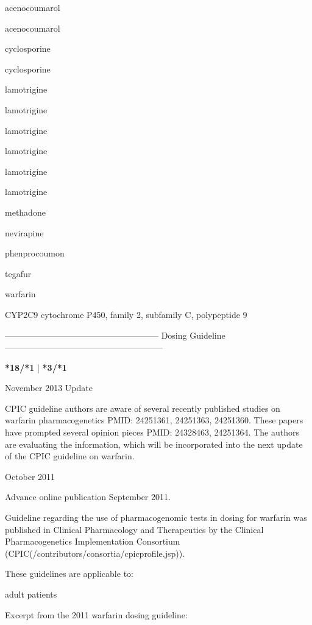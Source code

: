\documentclass{resume} %
\begin{document}
\begin{rSection}{ acenocoumarol }
\begin{rSection}{ acenocoumarol }
\begin{rSection}{ cyclosporine }
\begin{rSection}{ cyclosporine }
\begin{rSection}{ lamotrigine }
\begin{rSection}{ lamotrigine }
\begin{rSection}{ lamotrigine }
\begin{rSection}{ lamotrigine }
\begin{rSection}{ lamotrigine }
\begin{rSection}{ lamotrigine }
\begin{rSection}{ methadone }
\begin{rSection}{ nevirapine }
\begin{rSection}{ phenprocoumon }
\begin{rSection}{ tegafur }
\end{rSection}
\begin{rSection}{ warfarin }
\item[]
\begin{rSubsection}{ CYP2C9 }{ cytochrome P450, family 2, subfamily C, polypeptide 9 }{}{}
\item[]
\item[] ------------------------------------------------------ Dosing Guideline --------------------------------------------------------\newline
\item[]
\item[] \textbf{ *18/*1 } | \textbf{ *3/*1 }
\item November 2013 Update
 \newline
\item CPIC guideline authors are aware of several recently published studies on warfarin pharmacogenetics PMID: 24251361, 24251363, 24251360. These papers have prompted several opinion pieces PMID: 24328463, 24251364. The authors are evaluating the information, which will be incorporated into the next update of the CPIC guideline on warfarin.
 \newline
\item October 2011
 \newline
\item Advance online publication September 2011. 
 \newline
\item Guideline regarding the use of pharmacogenomic tests in dosing for warfarin was published in Clinical Pharmacology and Therapeutics by the Clinical Pharmacogenetics Implementation Consortium (CPIC(/contributors/consortia/cpicprofile.jsp)).  
 \newline
\item These guidelines are applicable to:
 \newline
\item adult patients
 \newline
\item Excerpt from the 2011 warfarin dosing guideline:
 \newline

\end{rSubsection}
\end{rSection}
\end{rSection}
\end{rSection}
\end{rSection}
\end{rSection}
\end{rSection}
\end{rSection}
\end{rSection}
\end{rSection}
\end{rSection}
\end{rSection}
\end{rSection}
\end{rSection}
\end{rSection}
\end{document}
